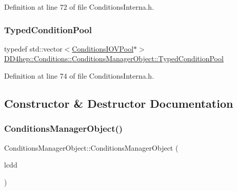 Definition at line 72 of file Conditions\+Interna.\+h.

\hypertarget{class_d_d4hep_1_1_conditions_1_1_conditions_manager_object_a1617c134372fbb79d06990707f19bb0c}{}\label{class_d_d4hep_1_1_conditions_1_1_conditions_manager_object_a1617c134372fbb79d06990707f19bb0c} 
\subsubsection{\texorpdfstring{Typed\+Condition\+Pool}{TypedConditionPool}}
{\footnotesize\ttfamily typedef std\+::vector$<$\hyperlink{class_d_d4hep_1_1_conditions_1_1_conditions_i_o_v_pool}{Conditions\+I\+O\+V\+Pool}$\ast$$>$ \hyperlink{class_d_d4hep_1_1_conditions_1_1_conditions_manager_object_a1617c134372fbb79d06990707f19bb0c}{D\+D4hep\+::\+Conditions\+::\+Conditions\+Manager\+Object\+::\+Typed\+Condition\+Pool}}



Definition at line 74 of file Conditions\+Interna.\+h.



\subsection{Constructor \& Destructor Documentation}
\hypertarget{class_d_d4hep_1_1_conditions_1_1_conditions_manager_object_adff4e6fe39f5057945ff8ac0634aad2e}{}\label{class_d_d4hep_1_1_conditions_1_1_conditions_manager_object_adff4e6fe39f5057945ff8ac0634aad2e} 
\subsubsection{\texorpdfstring{Conditions\+Manager\+Object()}{ConditionsManagerObject()}}
{\footnotesize\ttfamily Conditions\+Manager\+Object\+::\+Conditions\+Manager\+Object (\begin{DoxyParamCaption}\item[{\hyperlink{class_d_d4hep_1_1_geometry_1_1_l_c_d_d}{L\+C\+DD} \&}]{lcdd }\end{DoxyParamCaption})}



